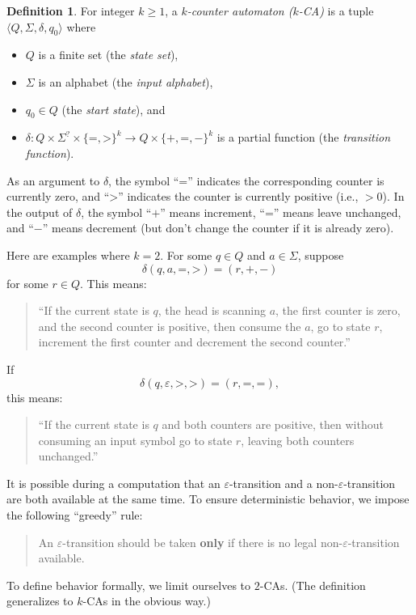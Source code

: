 \documentclass[11pt]{article}
\newcommand{\emptystr}{\varepsilon}
\newcommand{\tuple}[1]{{\langle{#1}\rangle}}
\newcommand{\syg}{\mathord{>}}
\newcommand{\sye}{\mathord{=}}
\newcommand{\syp}{\mathord{+}}
\newcommand{\sym}{\mathord{-}}
\theoremstyle{definition}
\newtheorem{definition}{Definition}
\begin{document}
\begin{definition}
For integer $k\ge 1$, a \emph{$k$-counter automaton ($k$-CA)} is a tuple $\tuple{Q,\Sigma,\delta,q_0}$ where
\begin{itemize}
\item
$Q$ is a finite set (the \emph{state set}),
\item
$\Sigma$ is an alphabet (the \emph{input alphabet}),
\item
$q_0\in Q$ (the \emph{start state}), and
\item
$\delta : Q \times \Sigma^? \times \{\sye,\syg\}^k  \rightarrow Q \times \{\syp,\sye,\sym\}^k$ is a partial function (the \emph{transition function}).
\end{itemize}
\end{definition}

As an argument to $\delta$, the symbol ``$\sye$'' indicates the corresponding counter is currently zero, and ``$\syg$'' indicates the counter is currently positive (i.e., $>0$).  In the output of $\delta$, the symbol ``$\syp$'' means increment, ``$\sye$'' means leave unchanged, and ``$\sym$'' means decrement (but don't change the counter if it is already zero).

Here are examples where $k=2$.  For some $q\in Q$ and $a\in\Sigma$, suppose
\[ \delta(q,a,\sye,\syg) = (r,\syp,\sym) \]
for some $r\in Q$.  This means:
\begin{quote}
``If the current state is $q$, the head is scanning $a$, the first counter is zero, and the second counter is positive, then consume the $a$, go to state $r$, increment the first counter and decrement the second counter.''
\end{quote}
If
\[ \delta(q,\emptystr,\mathord{>},\mathord{>}) = (r,\mathord{=},\mathord{=}), \]
this means:
\begin{quote}
``If the current state is $q$ and both counters are positive, then without consuming an input symbol go to state $r$, leaving both counters unchanged.''
\end{quote}
It is possible during a computation that an $\emptystr$-transition and a non-$\emptystr$-transition are both available at the same time.  To ensure deterministic behavior, we impose the following ``greedy'' rule:
\begin{quote}
An $\emptystr$-transition should be taken \textbf{only} if there is no legal non-$\emptystr$-transition available.
\end{quote}

To define behavior formally, we limit ourselves to $2$-CAs.  (The definition generalizes to $k$-CAs in the obvious way.)
\end{document}
